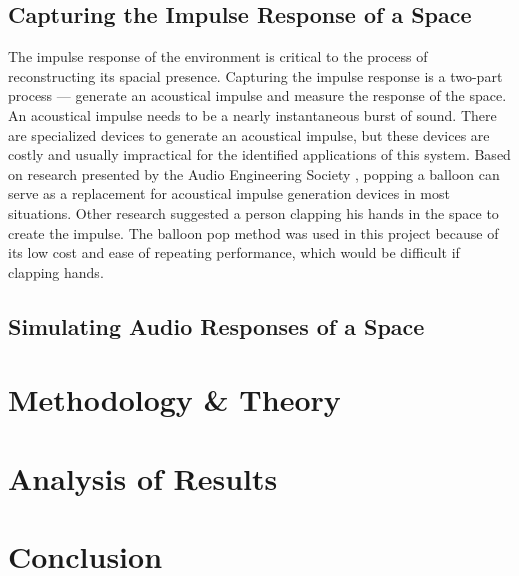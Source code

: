 \documentclass[letterpaper, 11pt, onecolumn, oneside]{article}
\begin{document}
    \subsection*{Capturing the Impulse Response of a Space}
    The impulse response of the environment is critical to the process of reconstructing its spacial presence.
    Capturing the impulse response is a two-part process --- generate an acoustical impulse and measure the response of the space.
    An acoustical impulse needs to be a nearly instantaneous burst of sound.
    There are specialized devices to generate an acoustical impulse, but these devices are costly and usually impractical for the identified applications of this system.
    Based on research presented by the Audio Engineering Society \cite{abel2010estimating}, popping a balloon can serve as a replacement for acoustical impulse generation devices in most situations.
    Other research suggested a person clapping his hands in the space to create the impulse.
    The balloon pop method was used in this project because of its low cost and ease of repeating performance, which would be difficult if clapping hands.

    \subsection*{Simulating Audio Responses of a Space}
    

\section*{Methodology \& Theory}


\section*{Analysis of Results}


\section*{Conclusion}


\newpage


\end{document}
